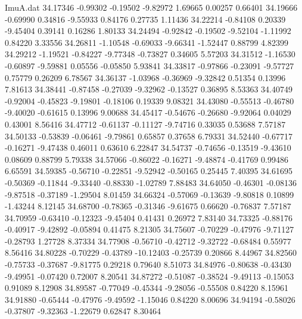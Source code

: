 \begin{filecontents}{ImuA.dat}
  34.17346   -0.99302   -0.19502   -9.82972    1.69665    0.00257    0.66401
  34.19666   -0.69990    0.34816   -9.55933    0.84176    0.27735    1.11436
  34.22214   -0.84108    0.20339   -9.45404    0.39141    0.16286    1.80133
  34.24494   -0.92842   -0.19502   -9.52104   -1.11992    0.84220    3.33556
  34.26811   -1.10548   -0.69033   -9.66341   -1.52447    0.88799    4.82399
  34.29212   -1.19521   -0.84227   -9.77348   -0.73827    0.34605    5.57203
  34.31512   -1.16530   -0.60897   -9.59881    0.05556   -0.05850    5.93841
  34.33817   -0.97866   -0.23091   -9.57727    0.75779    0.26209    6.78567
  34.36137   -1.03968   -0.36969   -9.32842    0.51354    0.13996    7.81613
  34.38441   -0.87458   -0.27039   -9.32962   -0.13527    0.36895    8.53363
  34.40749   -0.92004   -0.45823   -9.19801   -0.18106    0.19339    9.08321
  34.43080   -0.55513   -0.46780   -9.40020   -0.61615    0.13996    9.00688
  34.45417   -0.54676   -0.26680   -9.92064    0.04029    0.43001    8.56416
  34.47712   -0.61137   -0.11127   -9.74716    0.33035    0.53688    7.57187
  34.50133   -0.53839   -0.06461   -9.79861    0.65857    0.37658    6.79331
  34.52440   -0.67717   -0.16271   -9.47438    0.46011    0.63610    6.22847
  34.54737   -0.74656   -0.13519   -9.43610    0.08609    0.88799    5.79338
  34.57066   -0.86022   -0.16271   -9.48874   -0.41769    0.99486    6.65591
  34.59385   -0.56710   -0.22851   -9.52942   -0.50165    0.25445    7.40395
  34.61695   -0.50369   -0.11844   -9.33440   -0.88330   -1.02789    7.88483
  34.64050   -0.46301   -0.08136   -9.87518   -0.37189   -1.29504    8.01459
  34.66324   -0.57069   -0.13639   -9.80818    0.10899   -1.43244    8.12145
  34.68700   -0.78365   -0.31346   -9.61675    0.66620   -0.76837    7.57187
  34.70959   -0.63410   -0.12323   -9.45404    0.41431    0.26972    7.83140
  34.73325   -0.88176   -0.40917   -9.42892   -0.05894    0.41475    8.21305
  34.75607   -0.70229   -0.47976   -9.71127   -0.28793    1.27728    8.37334
  34.77908   -0.56710   -0.42712   -9.32722   -0.68484    0.55977    8.56416
  34.80228   -0.70229   -0.43789  -10.12403   -0.25739    0.20866    8.44967
  34.82560   -0.75733   -0.37687   -9.81775    0.29218    0.79640    8.51073
  34.84976   -0.80638   -0.43430   -9.49951   -0.07420    0.72007    8.20541
  34.87272   -0.51087   -0.38524   -9.49113   -0.15053    0.91089    8.12908
  34.89587   -0.77049   -0.45344   -9.28056   -0.55508    0.84220    8.15961
  34.91880   -0.65444   -0.47976   -9.49592   -1.15046    0.84220    8.00696
  34.94194   -0.58026   -0.37807   -9.32363   -1.22679    0.62847    8.30464

\end{filecontents}
